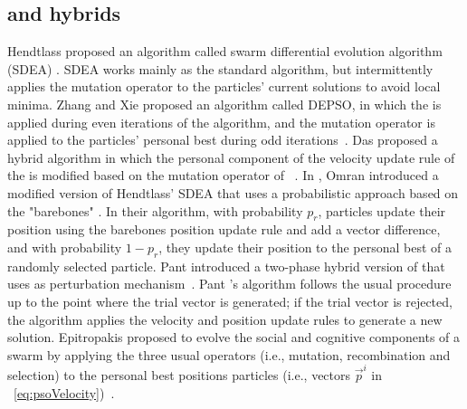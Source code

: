 \subsection{\PSO and \DE hybrids}
Hendtlass proposed an algorithm called swarm differential evolution algorithm (SDEA) \cite{Hendtlass01:iea-aie}. SDEA works mainly as the standard \PSO algorithm, but intermittently applies the \DE mutation operator to the particles' current solutions to avoid local minima. %
Zhang and Xie proposed an algorithm called DEPSO, in which the \stanPSO is applied during even iterations of the algorithm, and the \DE mutation operator is applied to the particles' personal best during odd iterations~\cite{ZhaXie03:ieee-smc}.
Das \etal proposed a hybrid algorithm in which the personal component of the velocity update rule of the \stanPSO is modified based on the mutation operator of \DE~\cite{DasKonCha05:gecco}.
In \cite{OmrEng07:ieee-sis}, Omran \etal introduced a modified version of Hendtlass’ SDEA that uses a probabilistic approach based on the "barebones" \PSO. 
In their algorithm, with probability $p_r$, particles update their position using the barebones \PSO position update rule and add a vector difference, and with probability $1-p_r$, they update their position to the personal best of a randomly selected particle.
Pant \etal introduced a two-phase hybrid version of \DE that uses \PSO as perturbation mechanism~\cite{PanThaGro08:ieee-dim}. Pant \etal's algorithm follows the usual \DE procedure up to the point where the trial vector is generated; if the trial vector is rejected, the algorithm applies the \PSO velocity and position update rules to generate a new solution.
Epitropakis \etal proposed to evolve the social and cognitive components of a swarm by applying the three usual \DE operators (i.e., mutation, recombination and selection) to the personal best positions particles (i.e., vectors $\vec{p}^{i}$ in \Eq~\ref{eq:psoVelocity})~\cite{EpiPlaVra12:is}. 

